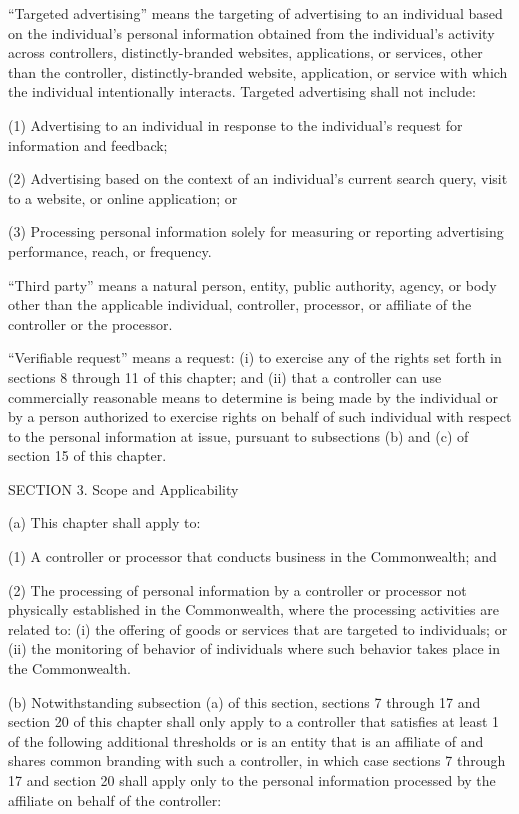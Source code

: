 “Targeted advertising” means the targeting of advertising to an individual based on the individual’s personal information obtained from the individual’s activity across controllers, distinctly-branded websites, applications, or services, other than the controller, distinctly-branded website, application, or service with which the individual intentionally interacts. Targeted advertising shall not include:

(1) Advertising to an individual in response to the individual’s request for information and feedback;

(2) Advertising based on the context of an individual’s current search query, visit to a website, or online application; or

(3) Processing personal information solely for measuring or reporting advertising performance, reach, or frequency. 

“Third party” means a natural person, entity, public authority, agency, or body other than the applicable individual, controller, processor, or affiliate of the controller or the processor.

“Verifiable request” means a request: (i) to exercise any of the rights set forth in sections 8 through 11 of this chapter; and (ii) that a controller can use commercially reasonable means to determine is being made by the individual or by a person authorized to exercise rights on behalf of such individual with respect to the personal information at issue, pursuant to subsections (b) and (c) of section 15 of this chapter. 

SECTION 3. Scope and Applicability

(a) This chapter shall apply to:

(1) A controller or processor that conducts business in the Commonwealth; and

(2) The processing of personal information by a controller or processor not physically established in the Commonwealth, where the processing activities are related to: (i) the offering of goods or services that are targeted to individuals; or (ii) the monitoring of behavior of individuals where such behavior takes place in the Commonwealth.

(b) Notwithstanding subsection (a) of this section, sections 7 through 17 and section 20 of this chapter shall only apply to a controller that satisfies at least 1 of the following additional thresholds or is an entity that is an affiliate of and shares common branding with such a controller, in which case sections 7 through 17 and section 20 shall apply only to the personal information processed by the affiliate on behalf of the controller:

